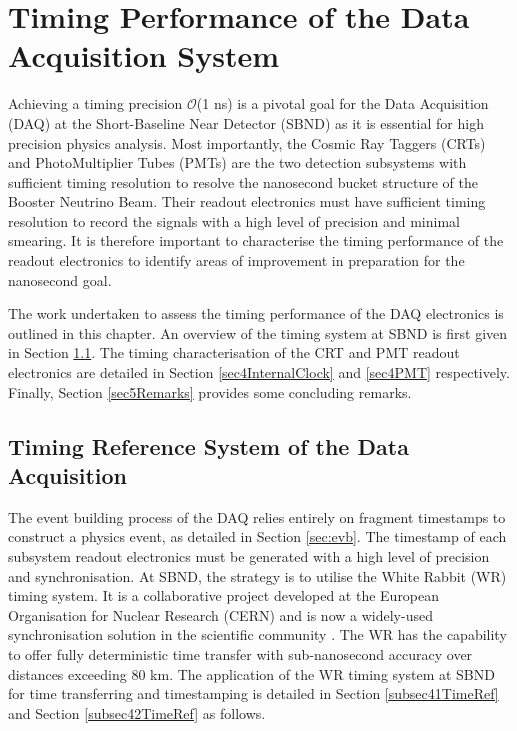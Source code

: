 \chapter{Timing Performance of the Data Acquisition System}
\label{ChapterDAQ}
\ifpdf
    \graphicspath{{Chapter7/Figs/Raster/}{Chapter7/Figs/PDF/}{Chapter7/Figs/}}
\else
    \graphicspath{{Chapter7/Figs/Vector/}{Chapter7/Figs/}}
\fi

Achieving a timing precision $\mathcal{O}$(1 ns) is a pivotal goal for the Data Acquisition (DAQ) at the Short-Baseline Near Detector (SBND) as it is essential for high precision physics analysis. 
Most importantly, the Cosmic Ray Taggers (CRTs) and PhotoMultiplier Tubes (PMTs) are the two detection subsystems with sufficient timing resolution to resolve the nanosecond bucket structure of the Booster Neutrino Beam.
Their readout electronics must have sufficient timing resolution to record the signals with a high level of precision and minimal smearing.
It is therefore important to characterise the timing performance of the readout electronics to identify areas of improvement in preparation for the nanosecond goal. 

The work undertaken to assess the timing performance of the DAQ electronics is outlined in this chapter.
An overview of the timing system at SBND is first given in Section \ref{sec4TimeRef}. 
The timing characterisation of the CRT and PMT readout electronics are detailed in Section \ref{sec4InternalClock} and \ref{sec4PMT} respectively.
Finally, Section \ref{sec5Remarks} provides some concluding remarks.

\section{Timing Reference System of the Data Acquisition}
\label{sec4TimeRef}

The event building process of the DAQ relies entirely on fragment timestamps to construct a physics event, as detailed in Section \ref{sec:evb}.
The timestamp of each subsystem readout electronics must be generated with a high level of precision and synchronisation.
At SBND, the strategy is to utilise the White Rabbit (WR) timing system.
It is a collaborative project developed at the European Organisation for Nuclear Research (CERN) and is now a widely-used synchronisation solution in the scientific community \cite{WR_paper}.
The WR has the capability to offer fully deterministic time transfer with sub-nanosecond accuracy over distances exceeding 80 km.
The application of the WR timing system at SBND for time transferring and timestamping is detailed in Section \ref{subsec41TimeRef} and Section \ref{subsec42TimeRef} as follows.

